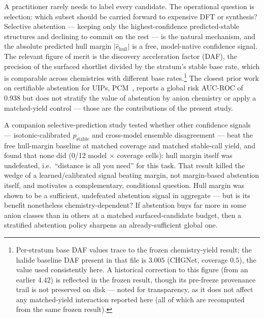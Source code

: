 \documentclass[11pt]{article}
\begin{document}
A practitioner rarely needs to label every candidate. The operational question is
selection: which subset should be carried forward to expensive DFT or synthesis? Selective
abstention --- keeping only the highest-confidence predicted-stable structures and declining
to commit on the rest --- is the natural mechanism, and the absolute predicted hull margin
$|\hat{e}_{\mathrm{hull}}|$ is a free, model-native confidence signal. The relevant figure of
merit is the discovery acceleration factor (DAF), the precision of the surfaced shortlist
divided by the stratum's stable base rate, which is comparable across chemistries with
different base rates.\footnote{Per-stratum base DAF values trace to the frozen chemistry-yield
result; the halide baseline DAF present in that file is $3.005$ (CHGNet, coverage $0.5$), the
value used consistently here. A historical correction to this figure (from an earlier $4.42$)
is reflected in the frozen result, though its pre-freeze provenance trail is not preserved on
disk --- noted for transparency, as it does not affect any matched-yield interaction reported
here (all of which are recomputed from the same frozen result).}
The closest prior work on certifiable abstention for UIPs, PCM~\citep{pcm2026}, reports a
global risk AUC-ROC of 0.938 but does not stratify the value of abstention by anion chemistry
or apply a matched-yield control --- those are the contributions of the present study.

A companion selective-prediction study tested whether other confidence signals ---
isotonic-calibrated $p_{\mathrm{stable}}$ and cross-model ensemble disagreement --- beat the
free hull-margin baseline at matched coverage and matched stable-call yield, and found
that none did (0/12 model $\times$ coverage cells): hull margin itself was undefeated, i.e.\
``distance is all you need'' for this task. That result killed the wedge of a
learned/calibrated signal beating margin, not margin-based abstention itself, and motivates a
complementary, conditional question. Hull margin was shown to be a sufficient,
undefeated abstention signal in aggregate --- but is its benefit nonetheless
chemistry-dependent? If abstention buys far more in some anion classes than in
others at a matched surfaced-candidate budget, then a stratified abstention policy sharpens
an already-sufficient global one.
\end{document}
